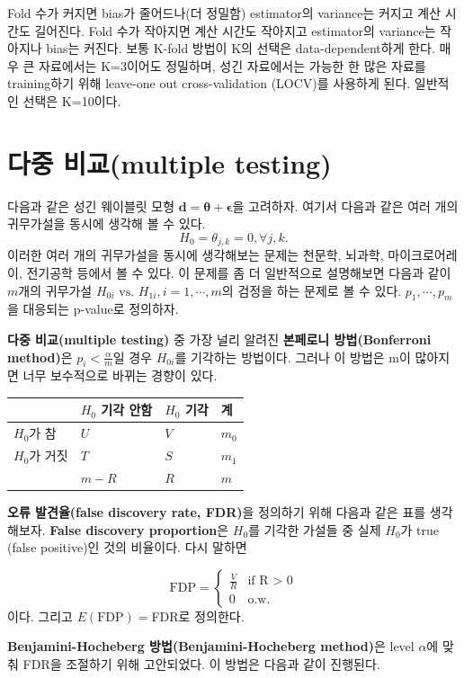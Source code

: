 \documentclass[b5paper,]{scrbook}
\theoremstyle{plain}
\theoremstyle{definition}
\numberwithin{equation}{section}
\begin{document}
Fold 수가 커지면 bias가 줄어드나(더 정밀함) estimator의 variance는
커지고 계산 시간도 길어진다. Fold 수가 작아지면 계산 시간도 작아지고
estimator의 variance는 작아지나 bias는 커진다. 보통 K-fold 방법이 K의
선택은 data-dependent하게 한다. 매우 큰 자료에서는 K=3이어도 정밀하며,
성긴 자료에서는 가능한 한 많은 자료를 training하기 위해 leave-one out
cross-validation (LOCV)를 사용하게 된다. 일반적인 선택은 K=10이다.

\section{다중 비교(multiple testing)}\label{-multiple-testing}

다음과 같은 성긴 웨이블릿 모형
\(\mathbf{d}=\mathbf{\theta}+\mathbf{\epsilon}\)을 고려하자. 여기서
다음과 같은 여러 개의 귀무가설을 동시에 생각해 볼 수 있다.
\[H_{0}=\theta_{j,k}=0, \forall j,k.\] 이러한 여러 개의 귀무가설을
동시에 생각해보는 문제는 천문학, 뇌과학, 마이크로어레이, 전기공학 등에서
볼 수 있다. 이 문제를 좀 더 일반적으로 설명해보면 다음과 같이 \(m\)개의
귀무가설 \(H_{0i} \text{ vs. } H_{1i}, i=1,\cdots ,m\)의 검정을 하는
문제로 볼 수 있다. \(p_{1},\cdots , p_{m}\)을 대응되는 p-value로
정의하자.

\textbf{다중 비교(multiple testing)} 중 가장 널리 알려진
\textbf{본페로니 방법(Bonferroni method)}은
\(p_{i} < \frac{\alpha}{m}\)일 경우 \(H_{0i}\)를 기각하는 방법이다.
그러나 이 방법은 m이 많아지면 너무 보수적으로 바뀌는 경향이 있다.

\begin{longtable}[]{@{}llll@{}}
\toprule
& \(H_{0}\) 기각 안함 & \(H_{0}\) 기각 & 계\tabularnewline
\midrule
\endhead
\(H_{0}\)가 참 & \(U\) & \(V\) & \(m_{0}\)\tabularnewline
\(H_{0}\)가 거짓 & \(T\) & \(S\) & \(m_{1}\)\tabularnewline
& \(m-R\) & \(R\) & \(m\)\tabularnewline
\bottomrule
\end{longtable}

\textbf{오류 발견율(false discovery rate, FDR)}을 정의하기 위해 다음과
같은 표를 생각해보자. \textbf{False discovery proportion}은 \(H_{0}\)를
기각한 가설들 중 실제 \(H_{0}\)가 true (false positive)인 것의 비율이다.
다시 말하면

\[
\text{FDP}=
\begin{cases}
\frac{V}{R} & \text{if R $>$ 0}\\
0 & \text{o.w.}
\end{cases}
\] 이다. 그리고 \(E(\text{FDP})=\)FDR로 정의한다.

\textbf{Benjamini-Hocheberg 방법(Benjamini-Hocheberg method)}은 level
\(\alpha\)에 맞춰 FDR을 조절하기 위해 고안되었다. 이 방법은 다음과 같이
진행된다.
\end{document}
